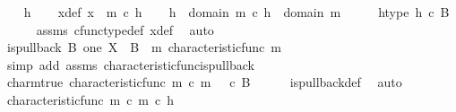 \begin{isabellebody}
\ \ \isamarkupfalse%
\ h\isanewline
\ \ \isamarkupfalse%
\ x{\isacharunderscore}{\kern0pt}def{\isacharcolon}{\kern0pt}\ {\isachardoublequoteopen}x\ {\isacharequal}{\kern0pt}\ m\ {\isasymcirc}\isactrlsub c\ h{\isachardoublequoteclose}\isanewline
\ \ \isamarkupfalse%
\ {\isachardoublequoteopen}h\ {\isacharcolon}{\kern0pt}\ domain\ {\isacharparenleft}{\kern0pt}m\ {\isasymcirc}\isactrlsub c\ h{\isacharparenright}{\kern0pt}\ {\isasymrightarrow}\ domain\ m{\isachardoublequoteclose}\isanewline
\ \ \isamarkupfalse%
\ \isamarkupfalse%
\ h{\isacharunderscore}{\kern0pt}type{\isacharcolon}{\kern0pt}\ {\isachardoublequoteopen}h\ {\isasymin}\isactrlsub c\ B{\isachardoublequoteclose}\isanewline
\ \ \ \ \isamarkupfalse%
\ assms{\isacharparenleft}{\kern0pt}{}{\isacharcomma}{\kern0pt}{}{\isacharparenright}{\kern0pt}\ cfunc{\isacharunderscore}{\kern0pt}type{\isacharunderscore}{\kern0pt}def\ x{\isacharunderscore}{\kern0pt}def\ \isamarkupfalse%
\ auto\isanewline
\isanewline
\ \ \isamarkupfalse%
\ {\isachardoublequoteopen}is{\isacharunderscore}{\kern0pt}pullback\ B\ one\ X\ {\isasymOmega}\ {\isacharparenleft}{\kern0pt}{\isasymbeta}\isactrlbsub B\isactrlesub {\isacharparenright}{\kern0pt}\ {\isasymt}\ m\ {\isacharparenleft}{\kern0pt}characteristic{\isacharunderscore}{\kern0pt}func\ m{\isacharparenright}{\kern0pt}{\isachardoublequoteclose}\isanewline
\ \ \ \ \isamarkupfalse%
\ {\isacharparenleft}{\kern0pt}simp\ add{\isacharcolon}{\kern0pt}\ assms\ characteristic{\isacharunderscore}{\kern0pt}func{\isacharunderscore}{\kern0pt}is{\isacharunderscore}{\kern0pt}pullback{\isacharparenright}{\kern0pt}\isanewline
\ \ \isamarkupfalse%
\ \isamarkupfalse%
\ char{\isacharunderscore}{\kern0pt}m{\isacharunderscore}{\kern0pt}true{\isacharcolon}{\kern0pt}\ {\isachardoublequoteopen}characteristic{\isacharunderscore}{\kern0pt}func\ m\ {\isasymcirc}\isactrlsub c\ m\ {\isacharequal}{\kern0pt}\ {\isasymt}\ {\isasymcirc}\isactrlsub c\ {\isasymbeta}\isactrlbsub B\isactrlesub {\isachardoublequoteclose}\isanewline
\ \ \ \ \isamarkupfalse%
\ is{\isacharunderscore}{\kern0pt}pullback{\isacharunderscore}{\kern0pt}def\ \isamarkupfalse%
\ auto\isanewline
\isanewline
\ \ \isamarkupfalse%
\ \isamarkupfalse%
\ {\isachardoublequoteopen}characteristic{\isacharunderscore}{\kern0pt}func\ m\ {\isasymcirc}\isactrlsub c\ m\ {\isasymcirc}\isactrlsub c\ h\ {\isacharequal}{\kern0pt}\ {\isasymf}{\isachardoublequoteclose}\isanewline

\end{isabellebody}
